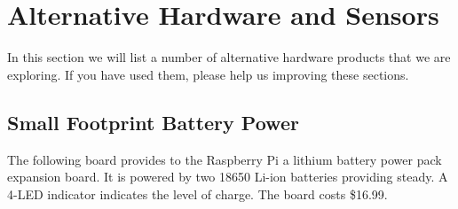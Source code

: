 \section{Alternative Hardware and Sensors}

In this section we will list a number of alternative hardware products
that we are exploring. If you have used them, please help us improving
these sections.

\subsection{Small Footprint Battery Power}

The following board provides to the Raspberry Pi a lithium battery
power pack expansion board. It is powered by two 18650 Li-ion
batteries providing steady. A 4-LED indicator indicates the level of
charge. The board costs \$16.99.

